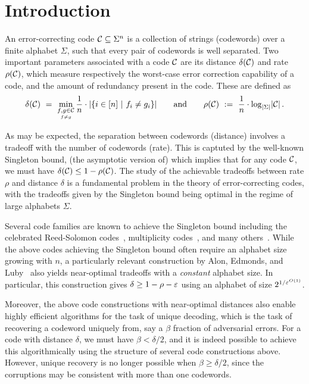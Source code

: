 \section{Introduction}
%
An error-correcting code ${\mathcal C} \subseteq \Sigma^n$ is a collection of strings (codewords) over a finite alphabet $\Sigma$, such that every pair of codewords is well separated. 
%
Two important parameters associated with a code ${\mathcal C}$ are its distance $\delta({\mathcal C})$ and rate $\rho({\mathcal C})$, which measure respectively the worst-case error correction capability of a code, and the amount of redundancy present in the code. These are defined as
%
\[
\delta({\mathcal C}) 
~=~ \min_{\underset{f\neq g}{f,g \in {\mathcal C}}} \frac{1}{n} \cdot \lvert\left\{i \in [n] ~|~ f_i \neq g_i\right\}\rvert
\qquad \text{and} \qquad
\rho({\mathcal C}) ~:=~ \frac{1}{n} \cdot \log_{\lvert\Sigma\rvert}\lvert{\mathcal C}\rvert \,.
\]
%

As may be expected, the separation between codewords (distance) involves a tradeoff with the number of codewords (rate). This is captuted by the well-known Singleton bound, (the asymptotic version of) which implies that for any code ${\mathcal C}$, we must have $\delta({\mathcal C}) \leq 1 - \rho({\mathcal C})$. 
%
The study of the achievable tradeoffs between rate $\rho$ and distance $\delta$ is a fundamental problem in the theory of error-correcting codes, with the tradeoffs given by the Singleton bound being optimal in the regime of large alphabets $\Sigma$. 

Several code families are known to achieve the Singleton bound including the celebrated Reed-Solomon codes~\cite{RS60}, multiplicity codes~\cite{KSY14, Kop15}, and many others~\cite{GRS23}. 
%
While the above codes achieving the Singleton bound often require an alphabet size growing with $n$, a particularly relevant construction by Alon, Edmonds, and Luby~\cite{AEL95} also yields near-optimal tradeoffs with a \emph{constant} alphabet size. 
%
In particular, this construction gives $\delta \geq 1 - \rho - \varepsilon$ using an alphabet of size $2^{1/\varepsilon^{O(1)}}$. 

Moreover, the above code constructions with near-optimal distances also enable highly efficient algorithms for the task of unique decoding, which is the task of recovering a codeword uniquely from, say a $\beta$ fraction of adversarial errors. 
%
For a code with distance $\delta$, we must have $\beta < \delta/2$, and it is indeed possible to achieve this algorithmically using the structure of several code constructions above. 
%
However, unique recovery is no longer possible when $\beta \geq \delta/2$, since the corruptions may be consistent with more than one codewords.  

